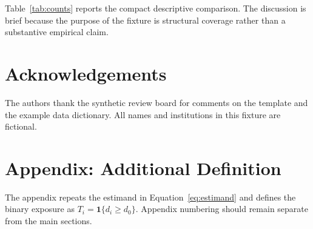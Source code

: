 \documentclass[11pt]{article}
\begin{document}
Table~\ref{tab:counts} reports the compact descriptive comparison. The discussion
is brief because the purpose of the fixture is structural coverage rather than a
substantive empirical claim.

\section*{Acknowledgements}

The authors thank the synthetic review board for comments on the template and
the example data dictionary. All names and institutions in this fixture are
fictional.

\appendix

\section{Appendix: Additional Definition}
\label{app:definition}

The appendix repeats the estimand in Equation~\ref{eq:estimand} and defines the
binary exposure as $T_i=\mathbf{1}\{d_i \geq d_0\}$. Appendix numbering should
remain separate from the main sections.
\end{document}
